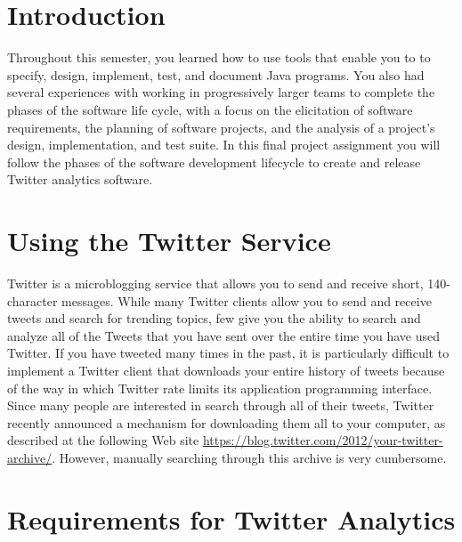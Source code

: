 

\usepackage[compact]{titlesec}



\section*{Introduction} 

Throughout this semester, you learned how to use tools that enable you to to specify, design, implement, test, and
document Java programs.  You also had several experiences with working in progressively larger teams to complete the
phases of the software life cycle, with a focus on the elicitation of software requirements, the planning of software
projects, and the analysis of a project's design, implementation, and test suite.  In this final project assignment you
will follow the phases of the software development lifecycle to create and release Twitter analytics software.

\section*{Using the Twitter Service}

Twitter is a microblogging service that allows you to send and receive short, 140-character messages.  While many
Twitter clients allow you to send and receive tweets and search for trending topics, few give you the ability to search
and analyze all of the Tweets that you have sent over the entire time you have used Twitter. If you have tweeted many
times in the past, it is particularly difficult to implement a Twitter client that downloads your entire history of
tweets because of the way in which Twitter rate limits its application programming interface.  Since many people are
interested in search through all of their tweets, Twitter recently announced a mechanism for downloading them all to
your computer, as described at the following Web site \url{https://blog.twitter.com/2012/your-twitter-archive/}.
However, manually searching through this archive is very cumbersome. 

\section*{Requirements for Twitter Analytics}

